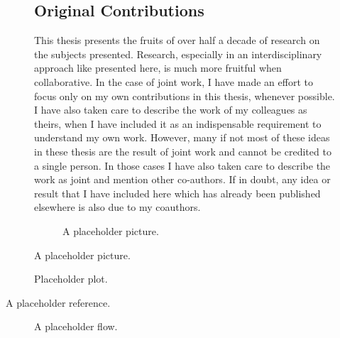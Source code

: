 \begin{figure}[h]
\subsection*{Original Contributions}
This thesis presents the fruits of over half a decade of research on the subjects presented. Research, especially in an interdisciplinary approach like presented here, is much more fruitful when collaborative.
In the case of joint work, I have made an effort to focus only on my own contributions in this thesis, whenever possible.
I have also taken care to describe the work of my colleagues as theirs, when I have included it as an indispensable requirement to understand my own work.
However,  many if not most of these ideas in these thesis are the result of joint work and cannot be credited to a single person.
In those cases I have also taken care to describe the work as joint and mention other co-authors.
If in doubt, any idea or result that I have included here which has already been published elsewhere is also due to my coauthors.

\begin{figure}[h]
	\centering
   \resizebox{0.55\textwidth}{!}{}
	\caption{A placeholder picture.}
	\label{fig:placeholder}
\end{figure}

\end{figure}
\begin{figure}[h]
	\centering
   \resizebox{0.55\textwidth}{!}{}
	\caption{Placeholder plot.} %
	\label{fig:placeholder_plot}
\end{figure}

A placeholder reference\cite{goens_multiprog18}.
\begin{figure}[h]
	\centering
   \resizebox{0.55\textwidth}{!}{}
	\caption{A placeholder flow.}
	\label{fig:placeholder_flow}
\end{figure}
